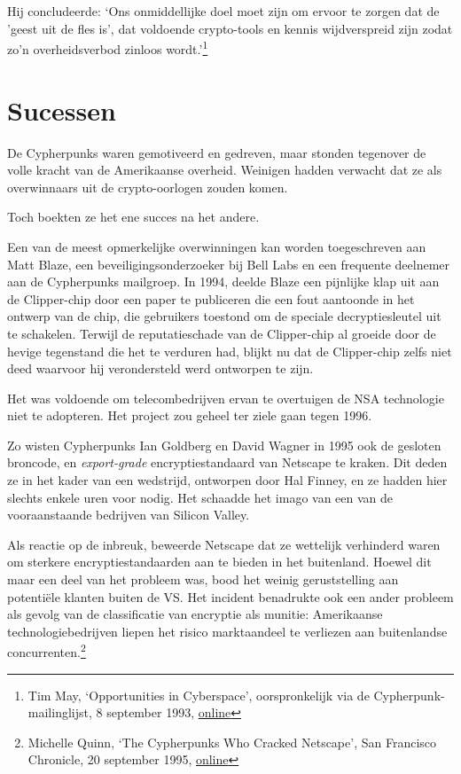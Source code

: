 \documentclass[smalldemyvopaper,11pt,twoside,onecolumn,openright,extrafontsizes,hidelinks]{memoir}
\begin{document}
Hij concludeerde: `Ons onmiddellijke doel moet zijn om ervoor te zorgen
dat de 'geest uit de fles is', dat voldoende crypto-tools en kennis
wijdverspreid zijn zodat zo'n overheidsverbod zinloos wordt.'\footnote{Tim
  May, `Opportunities in Cyberspace', oorspronkelijk via de
  Cypherpunk-mailinglijst, 8 september 1993,
  \href{https://cypherpunks.venona.com/date/1993/09/msg00140.html}{online}}

\section{Sucessen}\label{sucessen}

De Cypherpunks waren gemotiveerd en gedreven, maar stonden tegenover de
volle kracht van de Amerikaanse overheid. Weinigen hadden verwacht dat
ze als overwinnaars uit de crypto-oorlogen zouden komen.

Toch boekten ze het ene succes na het andere.

Een van de meest opmerkelijke overwinningen kan worden toegeschreven aan
Matt Blaze, een beveiligingsonderzoeker bij Bell Labs en een frequente
deelnemer aan de Cypherpunks mailgroep. In 1994, deelde Blaze een
pijnlijke klap uit aan de Clipper-chip door een paper te publiceren die
een fout aantoonde in het ontwerp van de chip, die gebruikers toestond
om de speciale decryptiesleutel uit te schakelen. Terwijl de
reputatieschade van de Clipper-chip al groeide door de hevige tegenstand
die het te verduren had, blijkt nu dat de Clipper-chip zelfs niet deed
waarvoor hij verondersteld werd ontworpen te zijn.

Het was voldoende om telecombedrijven ervan te overtuigen de NSA
technologie niet te adopteren. Het project zou geheel ter ziele gaan
tegen 1996.

Zo wisten Cypherpunks Ian Goldberg en David Wagner in 1995 ook de
gesloten broncode, en \emph{export-grade} encryptiestandaard van
Netscape te kraken. Dit deden ze in het kader van een wedstrijd,
ontworpen door Hal Finney, en ze hadden hier slechts enkele uren voor
nodig. Het schaadde het imago van een van de vooraanstaande bedrijven
van Silicon Valley.

Als reactie op de inbreuk, beweerde Netscape dat ze wettelijk verhinderd
waren om sterkere encryptiestandaarden aan te bieden in het buitenland.
Hoewel dit maar een deel van het probleem was, bood het weinig
geruststelling aan potentiële klanten buiten de VS. Het incident
benadrukte ook een ander probleem als gevolg van de classificatie van
encryptie als munitie: Amerikaanse technologiebedrijven liepen het
risico marktaandeel te verliezen aan buitenlandse
concurrenten.\footnote{Michelle Quinn, `The Cypherpunks Who Cracked
  Netscape', San Francisco Chronicle, 20 september 1995,
  \href{https://people.eecs.berkeley.edu//~daw/press/iang/ian1.html}{online}}
\end{document}
